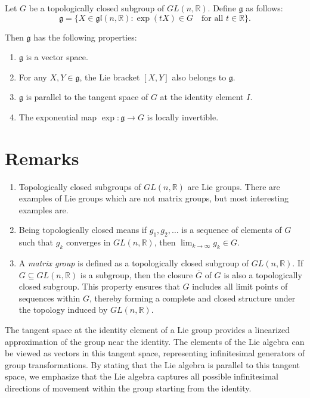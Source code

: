 \documentclass{article}
\begin{document}
\begin{theorem}
Let \( G \) be a topologically closed subgroup of \( GL(n, \mathbb{R}) \). Define \( \mathfrak{g} \) as follows:
\[
\mathfrak{g} = \{ X \in \mathfrak{gl}(n, \mathbb{R}) : \exp(tX) \in G \quad \text{for all } t \in \mathbb{R} \}.
\]     

Then \( \mathfrak{g} \) has the following properties:
\begin{enumerate}
  \item \( \mathfrak{g} \) is a vector space.
  \item For any \( X, Y \in \mathfrak{g} \), the Lie bracket \( [X, Y] \) also belongs to \( \mathfrak{g} \).
  \item \( \mathfrak{g} \) is parallel to the tangent space of \( G \) at the identity element \( I \).
  \item The exponential map \( \exp: \mathfrak{g} \to G \) is locally invertible.
\end{enumerate}

\end{theorem}

\section*{Remarks}
\begin{enumerate}
  \item Topologically closed subgroups of \( GL(n, \mathbb{R}) \) are Lie groups. There are examples of Lie groups which are not matrix groups, but most interesting examples are.
  \item Being topologically closed means if \( g_1, g_2, \dots \) is a sequence of elements of \( G \) such that \( g_k \) converges in \( GL(n, \mathbb{R}) \), then \( \lim_{k \to \infty} g_k \in G \).
  \item  A \emph{matrix group} is defined as a topologically closed subgroup of \( GL(n, \mathbb{R}) \). If \( G \subseteq GL(n, \mathbb{R}) \) is a subgroup, then the closure \( \overline{G} \) of \( G \) is also a topologically closed subgroup. This property ensures that \( G \) includes all limit points of sequences within \( G \), thereby forming a complete and closed structure under the topology induced by \( GL(n, \mathbb{R}) \). 
\end{enumerate} 

The tangent space at the identity element of a Lie group provides a linearized approximation of the group near the identity. The elements of the Lie algebra can be viewed as vectors in this tangent space, representing infinitesimal generators of group transformations. By stating that the Lie algebra is parallel to this tangent space, we emphasize that the Lie algebra captures all possible infinitesimal directions of movement within the group starting from the identity.  
\end{document}
